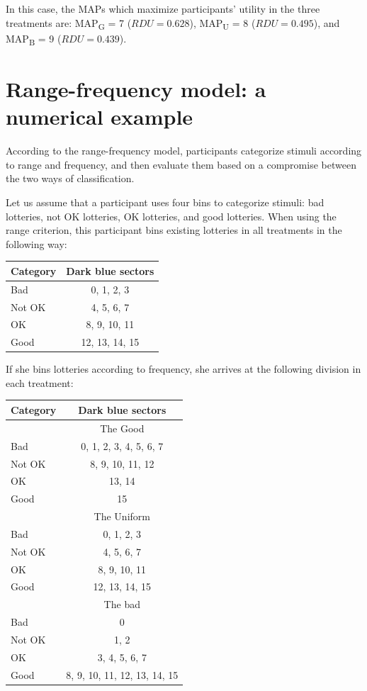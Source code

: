 In this case, the MAPs which maximize participants' utility in the three treatments are: MAP\textsubscript{G} = 7 ($RDU = 0.628$), MAP\textsubscript{U} = 8 ($RDU = 0.495$), and MAP\textsubscript{B} = 9 ($RDU = 0.439$).

\section{Range-frequency model: a numerical example}
\label{section:appendixb}
\setcounter{figure}{0}
\setcounter{table}{0}
\renewcommand{\thefigure}{B.\arabic{figure}}
\renewcommand{\thetable}{B.\arabic{table}}
According to the range-frequency model, participants categorize stimuli according to range and frequency, and then evaluate them based on a compromise between the two ways of classification.

Let us assume that a participant uses four bins to categorize stimuli: bad lotteries, not OK lotteries, OK lotteries, and good lotteries.
When using the range criterion, this participant bins existing lotteries in all treatments in the following way:
\begin{center}
\begin{tabular}{p{3cm} c}
Category & Dark blue sectors \\
\hline
Bad & 0, 1, 2, 3\\
Not OK & 4, 5, 6, 7\\
OK & 8, 9, 10, 11\\
Good & 12, 13, 14, 15\\
\hline
\end{tabular}
\end{center}

If she bins lotteries according to frequency, she arrives at the following division in each treatment:
\begin{center}
\begin{tabular}{p{3cm} c}
Category & Dark blue sectors \\
\hline
& The Good \\
\cmidrule{2-2}
Bad & 0, 1, 2, 3, 4, 5, 6, 7\\
Not OK & 8, 9, 10, 11, 12\\
OK & 13, 14\\
Good & 15\\
\cmidrule{2-2}
& The Uniform \\
\cmidrule{2-2}
Bad & 0, 1, 2, 3\\
Not OK & 4, 5, 6, 7\\
OK & 8, 9, 10, 11\\
Good & 12, 13, 14, 15\\
\cmidrule{2-2}
& The bad \\
\cmidrule{2-2}
Bad & 0\\
Not OK & 1, 2\\
OK & 3, 4, 5, 6, 7\\
Good & 8, 9, 10, 11, 12, 13, 14, 15\\
\hline
\end{tabular}
\end{center}

